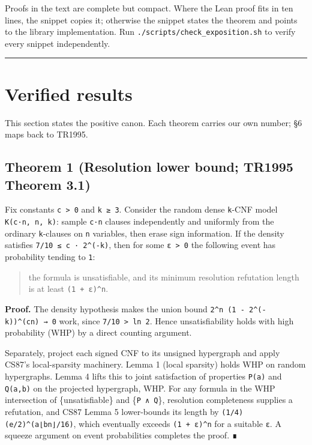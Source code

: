 \documentclass[11pt,a4paper]{article}
\begin{document}
Proofs in the text are complete but compact. Where the Lean proof fits in ten lines, the snippet copies it; otherwise the snippet states the theorem and points to the library implementation. Run \texttt{./scripts/check\_exposition.sh} to verify every snippet independently.

\begin{center}\rule{0.5\linewidth}{0.5pt}\end{center}

\hypertarget{verified-results}{%
\section{Verified results}\label{verified-results}}

This section states the positive canon. Each theorem carries our own number; §6 maps back to TR1995.

\hypertarget{theorem-1-resolution-lower-bound-tr1995-theorem-3.1}{%
\subsection{Theorem 1 (Resolution lower bound; TR1995 Theorem 3.1)}\label{theorem-1-resolution-lower-bound-tr1995-theorem-3.1}}

Fix constants \texttt{c\ \textgreater{}\ 0} and \texttt{k\ ≥\ 3}. Consider the random dense \texttt{k}-CNF model \texttt{K(c·n,\ n,\ k)}: sample \texttt{c·n} clauses independently and uniformly from the ordinary \texttt{k}-clauses on \texttt{n} variables, then erase sign information. If the density satisfies \texttt{7/10\ ≤\ c\ ·\ 2\^{}(-k)}, then for some \texttt{ε\ \textgreater{}\ 0} the following event has probability tending to \texttt{1}:

\begin{quote}
the formula is unsatisfiable, and its minimum resolution refutation length is at least \texttt{(1\ +\ ε)\^{}n}.
\end{quote}

\textbf{Proof.} The density hypothesis makes the union bound \texttt{2\^{}n\ (1\ -\ 2\^{}(-k))\^{}(cn)\ →\ 0} work, since \texttt{7/10\ \textgreater{}\ ln\ 2}. Hence unsatisfiability holds with high probability (WHP) by a direct counting argument.

Separately, project each signed CNF to its unsigned hypergraph and apply CS87's local-sparsity machinery. Lemma 1 (local sparsity) holds WHP on random hypergraphs. Lemma 4 lifts this to joint satisfaction of properties \texttt{P(a)} and \texttt{Q(a,b)} on the projected hypergraph, WHP. For any formula in the WHP intersection of \{unsatisfiable\} and \{\texttt{P\ ∧\ Q}\}, resolution completeness supplies a refutation, and CS87 Lemma 5 lower-bounds its length by \texttt{(1/4)(e/2)\^{}(a⌊bn⌋/16)}, which eventually exceeds \texttt{(1\ +\ ε)\^{}n} for a suitable \texttt{ε}. A squeeze argument on event probabilities completes the proof. ∎
\end{document}
